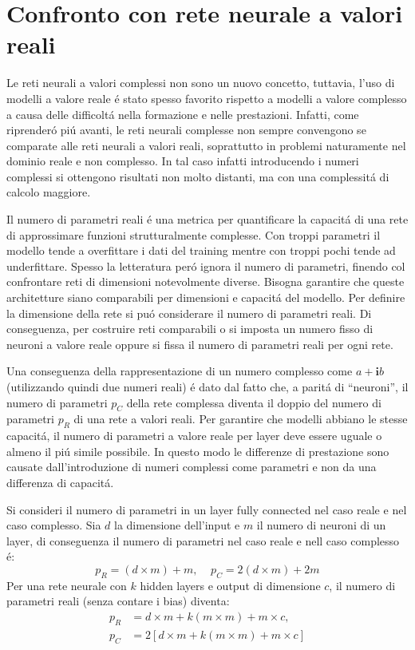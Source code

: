 \documentclass[a4paper,12pt]{report}
\begin{document}
 \section{Confronto con rete neurale a valori reali} \label{CompR-Csection}
 
 Le reti neurali a valori complessi non sono un nuovo concetto, tuttavia, l'uso di modelli a valore reale \'e stato spesso favorito rispetto a modelli a valore complesso a causa delle difficolt\'a nella formazione e nelle prestazioni.
 Infatti, come riprender\'o pi\'u avanti, le reti neurali complesse non sempre convengono se comparate alle reti neurali a valori reali, soprattutto in problemi naturamente nel dominio reale e non complesso. 
 In tal caso infatti introducendo i numeri complessi si ottengono risultati non molto distanti, ma con una complessit\'a di calcolo maggiore. 
 
 Il numero di parametri reali \'e una metrica per quantificare la capacit\'a di una rete di approssimare funzioni strutturalmente complesse. 
 Con troppi parametri il modello tende a overfittare i dati del training mentre con troppi pochi tende ad underfittare. Spesso la letteratura per\'o ignora il numero di parametri, finendo col confrontare reti di dimensioni notevolmente diverse.  
 Bisogna garantire che queste architetture siano comparabili per dimensioni e capacit\'a del modello. 
 Per definire la dimensione della rete si pu\'o considerare il numero di parametri reali. 
 Di conseguenza, per costruire reti comparabili o si imposta un numero fisso di neuroni a valore reale oppure si fissa il numero di parametri reali per ogni rete.
 
 Una conseguenza della rappresentazione di un numero complesso come $a+\textbf{i}b$ (utilizzando quindi due numeri reali) \'e dato dal fatto che, a parit\'a di ``neuroni'', il numero di parametri $p_C$ della rete complessa diventa il doppio del numero di parametri $p_R$ di una rete a valori reali. 
 Per garantire che  modelli abbiano le stesse capacit\'a, il numero di parametri a valore reale per layer deve essere uguale o almeno il pi\'u simile possibile. 
 In questo modo le differenze di prestazione sono causate dall'introduzione di numeri complessi come parametri e non da una differenza di capacit\'a. 
 
 Si consideri il numero di parametri in un layer fully connected nel caso reale e nel caso complesso. 
 Sia $d$ la dimensione dell'input e $m$ il numero di neuroni di un layer, di conseguenza il numero di parametri nel caso reale e nell caso complesso \'e:
 \begin{equation}
  p_R = (d \times m) + m, \;\;\;\; p_C = 2(d \times m) + 2m
 \end{equation}
 Per una rete neurale con $k$ hidden layers e output di dimensione $c$, il numero di parametri reali (senza contare i bias) diventa:
 \begin{align}
  p_R &= d \times m + k(m \times m) + m \times c, \\
  p_C &= 2\left[ d \times m + k(m \times m) + m \times c \right]
 \end{align}
 
\end{document}
